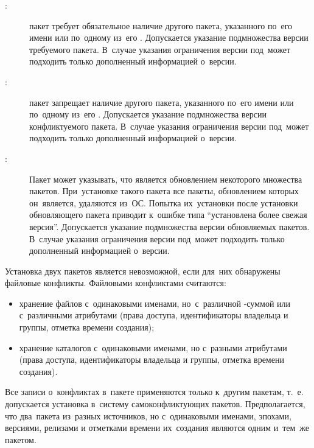 \begin{description}

\item[\Requires:]
пакет требует обязательное наличие другого пакета, указанного по~его имени или по~одному из~его \provides.
Допускается указание подмножества версии требуемого пакета.
В~случае указания ограничения версии под~\requires может подходить \provides только дополненный информацией о~версии.

\item[\Conflicts:]
пакет запрещает наличие другого пакета, указанного по~его имени или по~одному из~его \provides.
Допускается указание подмножества версии конфликтуемого пакета.
В~случае указания ограничения версии под~\conflicts может подходить \provides только дополненный информацией о~версии.

\item[\Obsoletes:]
Пакет может указывать, что является обновлением некоторого множества пакетов.
При~установке такого пакета все пакеты, обновлением которых он~является, удаляются из~ОС.
Попытка их~установки после установки обновляющего пакета приводит к~ошибке типа ``установлена более свежая версия''.
Допускается указание подмножества версии обновляемых пакетов.
В~случае указания ограничения версии под~\obsoletes может подходить \provides только дополненный информацией о~версии.

\end{description}

Установка двух пакетов является невозможной, если для~них обнаружены файловые конфликты.
Файловыми конфликтами считаются:

\begin{itemize}

\item {
хранение файлов с~одинаковыми именами, но~с~различной -суммой или с~различными атрибутами 
(права доступа, идентификаторы владельца и группы, отметка времени создания);
}

\item {
хранение каталогов с~одинаковыми именами, но с~разными атрибутами 
(права доступа, идентификаторы владельца и группы, отметка времени создания).
}

\end{itemize}

Все записи о~конфликтах в~пакете применяются только к~другим пакетам,
т.~е. допускается установка в~систему самоконфликтующих пакетов.
Предполагается, что два~пакета из~разных источников, но с~одинаковыми именами, эпохами, версиями, релизами и отметками времени их~создания являются одним и~тем~же пакетом.

